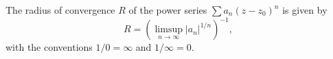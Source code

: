 The radius of convergence $R$ of the power series $\sum a_n (z - z_0)^n$ is given by
$$R = \left( \limsup_{n \to \infty} |a_n|^{1/n} \right)^{-1},$$
with the conventions $1/0 = \infty$ and $1/\infty = 0$.
